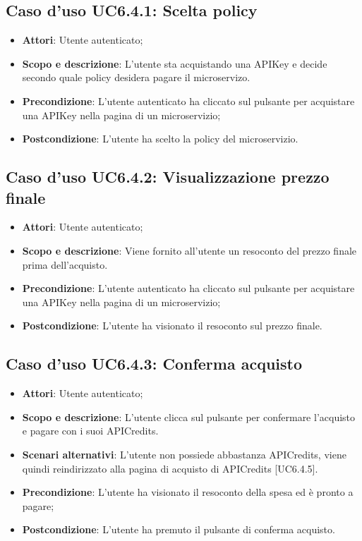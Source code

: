 \documentclass[12pt,a4paper,titlepage]{article}
\begin{document}
	\subsection{Caso d'uso UC6.4.1: Scelta policy}
	\label{UC6.4.1}
	\begin{itemize}
		\item \textbf{Attori}: Utente autenticato;
		\item \textbf{Scopo e descrizione}: L'utente sta acquistando una APIKey e decide secondo quale policy desidera pagare il microservizo.
		\item \textbf{Precondizione}: L'utente autenticato ha cliccato sul pulsante per acquistare una APIKey nella pagina di un microservizio;
		\item \textbf{Postcondizione}: L'utente ha scelto la policy del microservizio.
	\end{itemize}
	\subsection{Caso d'uso UC6.4.2: Visualizzazione prezzo finale}
	\label{UC6.4.2}
	\begin{itemize}
		\item \textbf{Attori}: Utente autenticato;
		\item \textbf{Scopo e descrizione}: Viene fornito all'utente un resoconto del prezzo finale prima dell'acquisto. 
		\item \textbf{Precondizione}: L'utente autenticato ha cliccato sul pulsante per acquistare una APIKey nella pagina di un microservizio;
		\item \textbf{Postcondizione}: L'utente ha visionato il resoconto sul prezzo finale.
	\end{itemize}
	\subsection{Caso d'uso UC6.4.3: Conferma acquisto}
	\label{UC6.4.3}
	\begin{itemize}
		\item \textbf{Attori}: Utente autenticato;
		\item \textbf{Scopo e descrizione}: L'utente clicca sul pulsante per confermare l'acquisto e pagare con i suoi APICredits.
		\item \textbf{Scenari alternativi}:
		L'utente non possiede abbastanza APICredits, viene quindi reindirizzato alla pagina di acquisto di APICredits [UC6.4.5].
		\item \textbf{Precondizione}: L'utente ha visionato il resoconto della spesa ed è pronto a pagare;
		\item \textbf{Postcondizione}: L'utente ha premuto il pulsante di conferma acquisto.
	\end{itemize}
\end{document}
